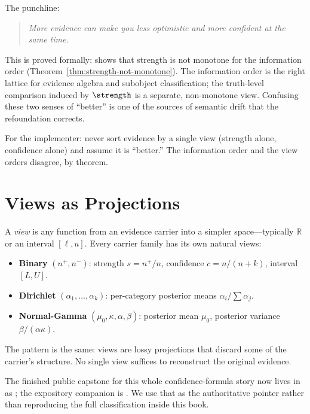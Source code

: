 \documentclass[11pt,openany]{report}
\begin{document}
\noindent
The punchline:
\begin{quote}
\emph{More evidence can make you less optimistic and more confident at
the same time.}
\end{quote}

\noindent
This is proved formally: 
shows that strength is not monotone for the information order
(Theorem~\ref{thm:strength-not-monotone}).  The information order is the
right lattice for evidence algebra and subobject classification; the
truth-level comparison induced by $\strength$ is a separate, non-monotone
view.  Confusing these two senses of ``better'' is one of the sources of
semantic drift that the refoundation corrects.

For the implementer: never sort evidence by a single view (strength alone,
confidence alone) and assume it is ``better.''  The information order and
the view orders disagree, by theorem.

\section{Views as Projections}

A \emph{view} is any function from an evidence carrier into a simpler
space---typically $\mathbb{R}$ or an interval $[\ell, u]$.  Every
carrier family has its own natural views:

\begin{itemize}
\item \textbf{Binary} $(n^+, n^-)$: strength $s = n^+/n$, confidence $c = n/(n+k)$, interval $[L, U]$.
\item \textbf{Dirichlet} $(\alpha_1, \ldots, \alpha_k)$: per-category posterior means $\alpha_i / \sum \alpha_j$.
\item \textbf{Normal-Gamma} $(\mu_0, \kappa, \alpha, \beta)$: posterior mean $\mu_0$, posterior variance $\beta / (\alpha \kappa)$.
\end{itemize}

\noindent
The pattern is the same: views are lossy projections that discard
some of the carrier's structure.  No single view suffices to
reconstruct the original evidence.

The finished public capstone for this whole confidence-formula story now lives
in  as
; the expository companion is
.  We use that as the
authoritative pointer rather than reproducing the full classification inside
this book.
\end{document}
